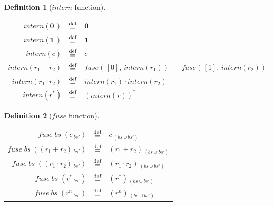 \documentclass[12pt]{article}
\newtheorem{definition}{Definition} %
\newcommand{\dn}{\ensuremath{\stackrel{\mbox{\scriptsize def}}{=}}}
\newcommand{\ZERO}{\textbf{0}}
\newcommand{\ONE}{\textbf{1}}
\newcommand{\fuse}{\textit{fuse}}
\newcommand{\intern}{\textit{intern}}
\begin{document}
\begin{definition}[$\intern$ function]\mbox{}
\begin{center}
{
  \renewcommand{\arraystretch}{1.7}
  \begin{tabular}{rcl}
    $ \intern(\ZERO\,) $       & \dn & $ \ZERO\, $ \\
    $ \intern(\ONE\,) $        & \dn & $ \ONE\, $ \\
    $ \intern(c) $             & \dn & $ c $ \\
    $ \intern(r_1 + r_2) $     & \dn & $ \fuse(\,[0],\, \intern(r_1)) \;+\; \fuse(\,[1],\, \intern(r_2)) $ \\
    $ \intern(r_1 \cdot r_2) $ & \dn & $ \intern(r_1) \cdot \intern(r_2) $ \\
    $ \intern(r^*) $           & \dn & $ (\intern(r))^* $ \\
  \end{tabular}%
}
\end{center}
\end{definition}



\begin{definition}[$\fuse$ function]\mbox{}
\begin{center}{
  \renewcommand{\arraystretch}{1.7}
  \begin{tabular}{rcl}
$ \fuse\; bs\; (c\,_{bs'}) $                & \dn & $ c\,_{(bs \cup bs')} $ \\
$ \fuse\; bs\; ((r_1 + r_2)\,_{bs'}) $      & \dn & $ (r_1 + r_2)\,_{(bs \cup bs')} $ \\
$ \fuse\; bs\; ((r_1 \cdot r_2)\,_{bs'}) $  & \dn & $ (r_1 \cdot r_2)\,_{(bs \cup bs')} $ \\
$ \fuse\; bs\; (r^*\,_{bs'}) $              & \dn & $ (r^*)\,_{(bs \cup bs')} $ \\
$ \fuse\; bs\; (r^n\,_{bs'}) $              & \dn & $ (r^n)\,_{(bs \cup bs')} $ \\
\end{tabular}
\renewcommand{\arraystretch}{1.0}
}
\end{center}
\end{definition}
\end{document}

